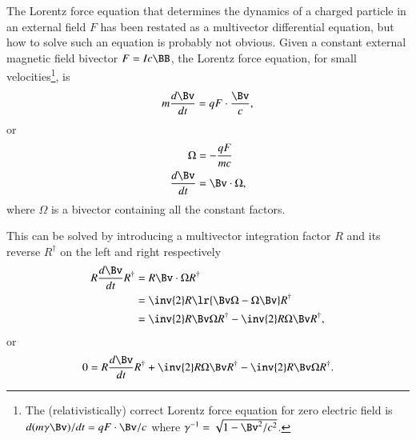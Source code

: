 %
%

The Lorentz force equation that determines the dynamics of a charged particle in an external field \( F \) has been restated as a multivector differential equation, but how to solve such an equation is probably not obvious.
Given a constant external magnetic field bivector \( F = I c \BB \), the Lorentz force equation, for small velocities\footnote{The (relativistically) correct Lorentz force equation for zero electric field is \( d(m \gamma \Bv)/dt = q F \cdot \Bv/c \) where \( \gamma^{-1} = \sqrt{1 - \Bv^2/c^2}\).}, is
\begin{equation}\label{eqn:lorentzForce_constantMagnetic:60}
m \frac{d\Bv}{dt} = q F \cdot \frac{\Bv}{c},
\end{equation}
or
\begin{equation}\label{eqn:lorentzForce_constantMagnetic:80}
\begin{aligned}
\Omega &= -\frac{q F}{m c} \\
\frac{d\Bv}{dt} &= \Bv \cdot \Omega,
\end{aligned}
\end{equation}
where \( \Omega \) is a bivector containing all the constant factors.

This can be solved by introducing a multivector integration factor \( R \) and its reverse \( R^\dagger \) on the left and right respectively
\begin{equation}\label{eqn:lorentzForce_constantMagnetic:100}
\begin{aligned}
R \frac{d\Bv}{dt} R^\dagger
&= R \Bv \cdot \Omega R^\dagger \\
&= \inv{2} R \lr{ \Bv \Omega - \Omega \Bv} R^\dagger \\
&= \inv{2} R \Bv \Omega R^\dagger - \inv{2} R \Omega \Bv R^\dagger,
\end{aligned}
\end{equation}
or
\begin{equation}\label{eqn:lorentzForce_constantMagnetic:120}
0 =
R \frac{d\Bv}{dt} R^\dagger
+ \inv{2} R \Omega \Bv R^\dagger
- \inv{2} R \Bv \Omega R^\dagger.
\end{equation}

